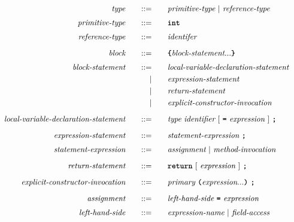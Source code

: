 \begin{alignat*}{9}
&& \textit{type}                                 && \quad ::= & \quad && \textit{primitive-type} \ | \ \textit{reference-type} && \\[1mm]
&& \textit{primitive-type}                       && \quad ::= & \quad && \textbf{\texttt{int}} && \\[1mm]
&& \textit{reference-type}                       && \quad ::= & \quad && \textit{identifer} && \\[2mm]
&& \textit{block}                                && \quad ::= & \quad && \textbf{\texttt{\{}} \textit{block-statement} ... \textbf{\texttt{\}}} && \\[1mm]
&& \textit{block-statement}                      && \quad ::= & \quad && \textit{local-variable-declaration-statement} && \\
&&                                               &&         | & \quad && \textit{expression-statement} && \\
&&                                               &&         | & \quad && \textit{return-statement} && \\
&&                                               &&         | & \quad && \textit{explicit-constructor-invocation} && \\[2mm]
&& \textit{local-variable-declaration-statement} && \quad ::= & \quad && \textit{type} \ \textit{identifier} \ [ \ \textbf{\texttt{=}} \ \textit{expression} \ ] \ \textbf{\texttt{;}} && \\[2mm]
&& \textit{expression-statement}                 && \quad ::= & \quad && \textit{statement-expression} \ \textbf{\texttt{;}} && \\[1mm]
&& \textit{statement-expression}                 && \quad ::= & \quad && \textit{assignment} \ | \ \textit{method-invocation} && \\[2mm]
&& \textit{return-statement}                     && \quad ::= & \quad && \textbf{\texttt{return}} \ [ \ \textit{expression} \ ] \ \textbf{\texttt{;}} && \\[2mm]
&& \textit{explicit-constructor-invocation}      && \quad ::= & \quad && \textit{primary} \ \textbf{\texttt{(}} \textit{expression} ... \textbf{\texttt{)}} \ \textbf{\texttt{;}} && \\[2mm]
&& \textit{assignment}                           && \quad ::= & \quad && \textit{left-hand-side} \ \textbf{\texttt{=}} \ \textit{expression} && \\[1mm]
&& \textit{left-hand-side}                       && \quad ::= & \quad && \textit{expression-name} \ | \ \textit{field-access} && \\[2mm]

\end{alignat*}
